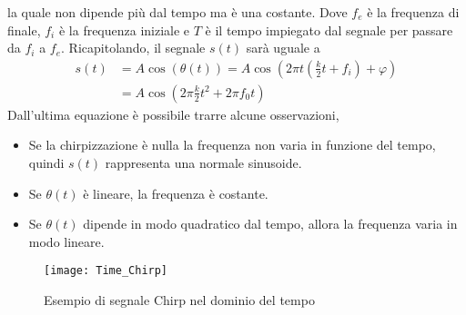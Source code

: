 la quale non dipende più dal tempo ma è una costante.  Dove $f_e$ è la frequenza di finale, $f_i$ è la
frequenza iniziale e $T$ è il tempo impiegato dal segnale per passare da $f_i$ a
$f_e$.
Ricapitolando, il segnale $s(t)$ sarà uguale a 
\begin{equation}
\begin{split}
        s(t) &=A\cos(\theta(t)) 
             =A\cos\left(2\pi t\left(\frac{k}{2}t+f_i\right) +
             \varphi\right)\\
             & = A\cos\left(2\pi\frac{k}{2}t^2+2\pi f_0 t\right)
\end{split}
\end{equation}
Dall'ultima equazione è possibile trarre alcune osservazioni, 
\begin{itemize}
        \item Se la chirpizzazione è nulla la frequenza non varia in funzione del
        tempo, quindi $s(t)$ rappresenta una normale sinusoide.
        \item Se $\theta(t)$ è lineare, la frequenza è costante. 
        \item Se $\theta(t)$ dipende in modo quadratico dal tempo, allora la
        frequenza varia in modo lineare.
\end{itemize}

\begin{figure}[h]
        \centering
                \texttt{[image: Time\_Chirp]}
        \caption{Esempio di segnale Chirp nel dominio del tempo}
\end{figure}

